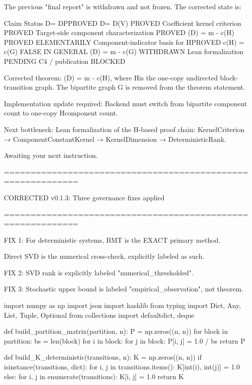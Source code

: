 The previous "final report" is withdrawn and not frozen. The corrected state is:

Claim	Status	
D\Pi = D\Pi P\Pi	PROVED	
 D\Pi = D\Pi(V\Pi)	PROVED	
Coefficient kernel criterion	PROVED	
Target-side component characterization	PROVED	
(D\Pi) = m - c(H\Pi)	PROVED ELEMENTARILY	
Component-indicator basis for H\Pi	PROVED	
c(H\Pi) = c{}(G)	FALSE IN GENERAL	
(D\Pi) = m - c{}(G)	WITHDRAWN	
Lean formalization	PENDING	
C4 / publication	BLOCKED	

Corrected theorem: (D\Pi) = m - c(H\Pi), where H\Pi is the one-copy undirected block-transition graph. The bipartite graph G is removed from the theorem statement.

Implementation update required: Backend must switch from bipartite component count to one-copy H\Pi component count.

Next bottleneck: Lean formalization of the H\Pi-based proof chain: KernelCriterion → ComponentConstantKernel → KernelDimension → DeterministicRank.

Awaiting your next instruction.

============================================================

CORRECTED v0.1.3: Three governance fixes applied

============================================================

FIX 1: For deterministic systems, BMT is the EXACT primary method.

Direct SVD is the numerical cross-check, explicitly labeled as such.

FIX 2: SVD rank is explicitly labeled "numerical_thresholded".

FIX 3: Stochastic upper bound is labeled "empirical_observation", not theorem.

import numpy as np
import json
import hashlib
from typing import Dict, Any, List, Tuple, Optional
from collections import defaultdict, deque

def build_partition_matrix(partition, n):
P = np.zeros((n, n))
for block in partition:
bs = len(block)
for i in block:
for j in block:
P[i, j] = 1.0 / bs
return P

def build_K_deterministic(transitions, n):
K = np.zeros((n, n))
if isinstance(transitions, dict):
for i, j in transitions.items():
K[int(i), int(j)] = 1.0
else:
for i, j in enumerate(transitions):
K[i, j] = 1.0
return K

